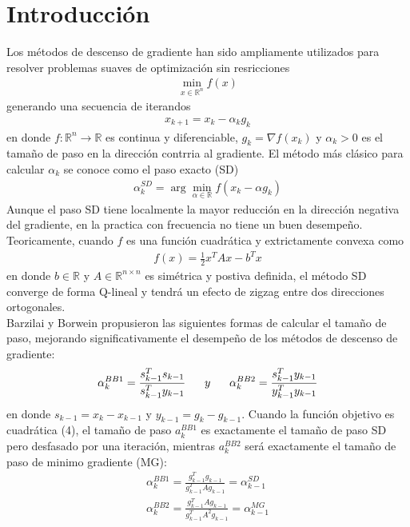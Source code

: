 \documentclass[conference]{IEEEtran}
\begin{document}
    \section{Introducción}
    Los métodos de descenso de gradiente han sido ampliamente utilizados para resolver problemas suaves de optimización sin resricciones
    \begin{align}
        \min_{x \in \mathbb{R}^n} f(x)
    \end{align}
    generando una secuencia de iterandos
    \begin{align}
        x_{k+1} =x_k - \alpha_k g_k
    \end{align}
    en donde $f: \mathbb{R}^n \to  \mathbb{R} $ es continua y diferenciable, $g_k = \nabla f(x_k)$ y $\alpha_k > 0$ es el tamaño de paso en la dirección contrria al gradiente. El método más clásico para calcular $\alpha_k$ se conoce como el paso exacto (SD)
    \begin{align}
        \alpha_k^{SD} = \arg \min_{\alpha \in \mathbb{R}} f(x_k - \alpha g_k)
    \end{align}
    Aunque el paso SD tiene localmente la mayor reducción en la dirección negativa del gradiente, en la practica con frecuencia no tiene un buen desempeño. Teoricamente, cuando $f$ es una función cuadrática y extrictamente convexa como
    \begin{align}
        f(x) = \frac{1}{2}x^T A x - b^T x
    \end{align}
    en donde $b \in \mathbb{R}$ y $A \in \mathbb{R}^{n\times n}$ es simétrica y postiva definida, el método SD converge de forma Q-lineal y tendrá un efecto de zigzag entre dos direcciones ortogonales.\\
    Barzilai y Borwein propusieron las siguientes formas de calcular el tamaño de paso, mejorando significativamente el desempeño de los métodos de descenso de gradiente:
    \begin{align}
        \alpha_k^{BB1}= \frac{s_{k-1}^T s_{k-1}}{s_{k-1}^Ty_{k-1}}   \hspace{0.6cm} y \hspace{0.6cm}  \alpha_k^{BB2}= \frac{s_{k-1}^T y_{k-1}}{y_{k-1}^Ty_{k-1}}
    \end{align}
    en donde $s_{k-1} = x_k - x_{k-1}$ y $y_{k-1} = g_k - g_{k-1}$. Cuando la función objetivo es cuadrática (4), el tamaño de paso $a_k^{BB1}$ es exactamente el tamaño de paso SD pero desfasado por una iteración, mientras $a_k^{BB2}$ será exactamente el tamaño de paso de minimo gradiente (MG):
    \begin{align*}
        \alpha_k^{BB1}= \frac{g_{k-1}^T g_{k-1}}{g_{k-1}^TAg_{k-1}}  = \alpha_{k-1}^{SD} \\
        \alpha_k^{BB2}= \frac{g_{k-1}^T Ag_{k-1}}{g_{k-1}^TA^2g_{k-1}} = \alpha_{k-1}^{MG}
    \end{align*}
\end{document}
